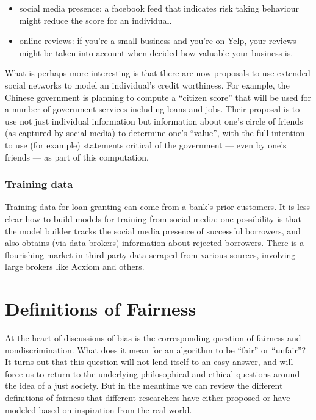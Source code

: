 \documentclass[11pt]{paper}
\begin{document}
\begin{itemize}
\itemsep1pt\parskip0pt
\item
  social media presence: a facebook feed that indicates risk taking
  behaviour might reduce the score for an individual.
\item
  online reviews: if you're a small business and you're on Yelp, your
  reviews might be taken into account when decided how valuable your
  business is.
\end{itemize}

What is perhaps more interesting is that there are now proposals to use
extended social networks to model an individual's credit worthiness. For
example, the Chinese government is planning to compute a ``citizen
score'' that will be used for a number of government services including
loans and jobs. Their proposal is to use not just individual information
but information about one's circle of friends (as captured by social
media) to determine one's ``value'', with the full intention to use (for
example) statements critical of the government --- even by one's friends
--- as part of this computation.

\subsubsection{Training data}\label{training-data-3}

Training data for loan granting can come from a bank's prior customers.
It is less clear how to build models for training from social media: one
possibility is that the model builder tracks the social media presence
of successful borrowers, and also obtains (via data brokers) information
about rejected borrowers. There is a flourishing market in third party
data scraped from various sources, involving large brokers like Acxiom
and others.

\section{Definitions of Fairness}\label{definitions-of-fairness}

At the heart of discussions of bias is the corresponding question of
fairness and nondiscrimination. What does it mean for an algorithm to be
``fair'' or ``unfair''? It turns out that this question will not lend
itself to an easy answer, and will force us to return to the underlying
philosophical and ethical questions around the idea of a just society.
But in the meantime we can review the different definitions of fairness
that different researchers have either proposed or have modeled based on
inspiration from the real world.
\end{document}
